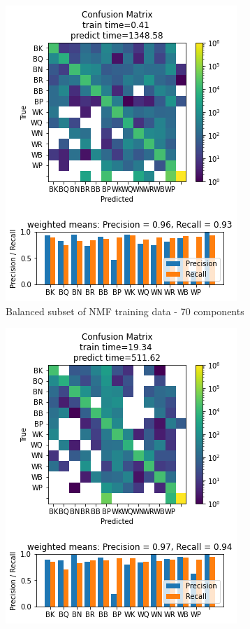 \documentclass{article}
\newcommand{\NMFBL}{Balanced subset of NMF training data - 70 components}
\begin{document}
\begin{figure}[h]
\begin{subfigure}{0.33\textwidth}
\includegraphics[width=0.9\linewidth]{GNB_B_NMF70c_160x160_evaluation.png} 
\caption{\NMFBL}
\end{subfigure}
\begin{subfigure}{0.33\textwidth}
\includegraphics[width=0.9\linewidth]{GNB_PCA50c_160x160_evaluation.png}

\end{subfigure}
\end{figure}
\end{document}
